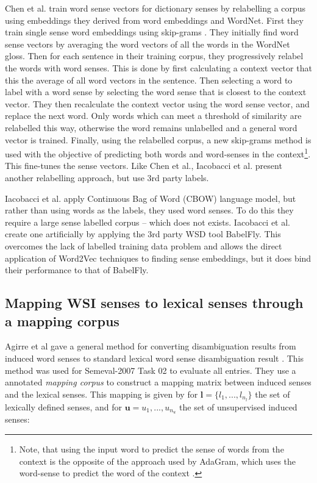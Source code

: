 \documentclass{sig-alternate}
\renewcommand{\l}{\mathbf{l}}
\renewcommand{\u}{\mathbf{u}}
\begin{document}
Chen et al. \parencite{Chen2014} train word sense vectors for dictionary senses by relabelling a corpus using embeddings they derived from word embeddings and WordNet. First they train single sense word embeddings using skip-grams \parencite{mikolov2013efficient}. They initially find word sense vectors by averaging the word vectors of all the words in the WordNet gloss.
Then for each sentence in their training corpus, they progressively relabel the words with word senses. This is done by first calculating a context vector that this the average of all word vectors in the sentence. Then selecting a word to label with a word sense by selecting the word sense that is closest to the context vector. They then recalculate the context vector using the word sense vector, and replace the next word. Only words which can meet a threshold of similarity are relabelled this way, otherwise the word remains unlabelled and a general word vector is trained.  Finally, using the relabelled corpus, a new skip-grams method is used with the objective of predicting both words and word-senses in the context\footnote{Note, that using the input word to predict the sense of words from the context is the opposite of the approach used by AdaGram, which uses the word-sense to predict the word of the context \parencite{AdaGrams}.}. This fine-tunes the sense vectors.  Like Chen et al., Iacobacci et al. \parencite{iacobacci2015sensembed} present another relabelling approach, but use 3rd party labels.


Iacobacci et al. \parencite{iacobacci2015sensembed} apply Continuous Bag of Word (CBOW) \parencite{mikolov2013efficient} language model, but rather than using words as the labels, they used word senses. To do this they require a large sense labelled corpus -- which does not exists. Iacobacci et al. create one artificially by applying the 3rd party WSD tool BabelFly. This overcomes the lack of labelled training data problem and allows the direct application of Word2Vec techniques to finding sense embeddings, but it does bind their performance to that of BabelFly.


\subsection{Mapping WSI senses to lexical senses through a mapping corpus}

Agirre et al gave a general method for converting disambiguation results from induced word senses to standard lexical word sense disambiguation result \parencite{agirre2006}. This method was used for Semeval-2007 Task 02 \parencite{SemEval2007WSIandWSD} to evaluate all entries.
They use a annotated \emph{mapping corpus} to construct a mapping matrix between induced senses and the lexical senses.
This mapping is given by for $\l=\{l_1,..., l_{n_l}\}$ the set of lexically defined senses, and for $\u={u_1,...,u_{n_u}}$ the set of unsupervised induced senses:
\end{document}
